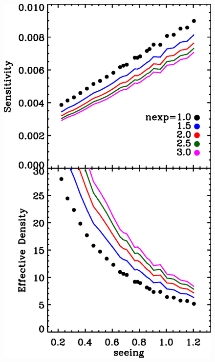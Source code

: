 \documentclass[12pt,preprint]{aastex}
\begin{document}
\begin{figure}[p]
    \centering
    \includegraphics[scale=0.6]{plots/des5yr-convolved-maxmag30.0-neff-vs-seeing.eps}

\end{figure}
\end{document}
